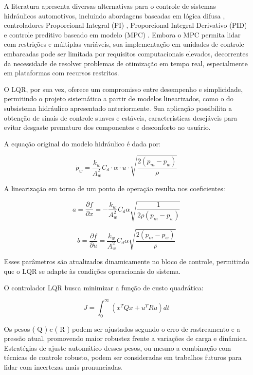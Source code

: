A literatura apresenta diversas alternativas para o controle de sistemas hidráulicos automotivos, incluindo abordagens baseadas em lógica difusa \cite{Pananurak2009}, controladores Proporcional-Integral (PI) \cite{YangYing2017}, Proporcional-Integral-Derivativo (PID) \cite{LuuAndLupu2019} e controle preditivo baseado em modelo (MPC) \cite{Tian2024, LihuaLuo2016}. Embora o MPC permita lidar com restrições e múltiplas variáveis, sua implementação em unidades de controle embarcadas pode ser limitada por requisitos computacionais elevados, decorrentes da necessidade de resolver problemas de otimização em tempo real, especialmente em plataformas com recursos restritos.

O LQR, por sua vez, oferece um compromisso entre desempenho e simplicidade, permitindo o projeto sistemático a partir de modelos linearizados, como o do subsistema hidráulico apresentado anteriormente. Sua aplicação possibilita a obtenção de sinais de controle suaves e estáveis, características desejáveis para evitar desgaste prematuro dos componentes e desconforto ao usuário.

A equação original do modelo hidráulico é dada por:

\begin{equation} \dot{p}_w = \frac{k_w}{A_w^2} C_d \cdot \alpha \cdot u \cdot \sqrt{\frac{2(p_m - p_w)}{\rho}} \end{equation}

A linearização em torno de um ponto de operação resulta nos coeficientes:

\begin{equation} a = \frac{\partial f}{\partial x} = -\frac{k_w}{A_w^2} C_d \alpha \sqrt{\frac{1}{2 \rho (p_m - p_w)}} \end{equation}

\begin{equation} b = \frac{\partial f}{\partial u} = \frac{k_w}{A_w^2} C_d \alpha \sqrt{\frac{2(p_m - p_w)}{\rho}} \end{equation}

Esses parâmetros são atualizados dinamicamente no bloco de controle, permitindo que o LQR se adapte às condições operacionais do sistema.

O controlador LQR busca minimizar a função de custo quadrática:

\begin{equation} J = \int_0^\infty (x^T Q x + u^T R u) dt \end{equation}

Os pesos ( Q ) e ( R ) podem ser ajustados segundo o erro de rastreamento e a pressão atual, promovendo maior robustez frente a variações de carga e dinâmica. Estratégias de ajuste automático desses pesos, ou mesmo a combinação com técnicas de controle robusto, podem ser consideradas em trabalhos futuros para lidar com incertezas mais pronunciadas.

